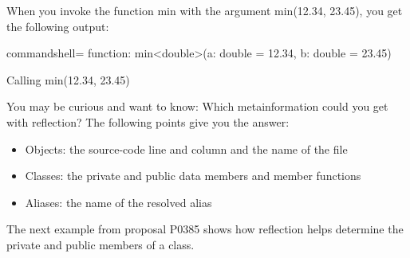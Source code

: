 When you invoke the function min with the argument min(12.34, 23.45), you get the following output:

\begin{tcblisting}{commandshell={}}
function: min<double>(a: double = 12.34, b: double = 23.45)
\end{tcblisting}

\begin{center}
Calling min(12.34, 23.45)
\end{center}

You may be curious and want to know: Which metainformation could you get with reflection? The following points give you the answer:

\begin{itemize}
\item 
Objects: the source-code line and column and the name of the file

\item 
Classes: the private and public data members and member functions

\item 
Aliases: the name of the resolved alias
\end{itemize}

The next example from proposal P0385 shows how reflection helps determine the private and public members of a class.

